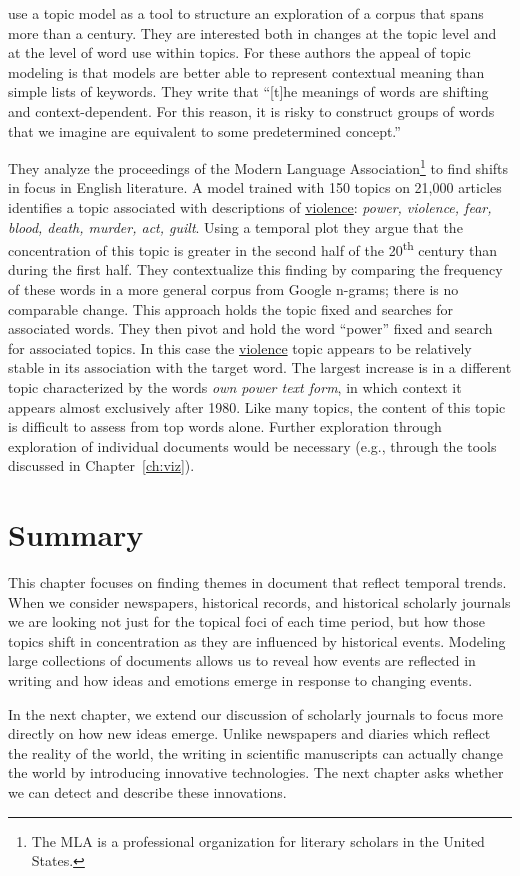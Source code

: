 \citet{Goldstone-14} use a topic model as a tool to structure an exploration of a corpus that spans more than a century.
They are interested both in changes at the topic level and at the level of word use within topics.
For these authors the appeal of topic modeling is that models are better able to represent contextual meaning than simple lists of keywords. They write that ``[t]he meanings
of words are shifting and context-dependent. For this reason, it is risky to
construct groups of words that we imagine are equivalent to some predetermined
concept.''

They analyze the proceedings of the Modern Language Association\footnote{The MLA is a professional organization for literary scholars in the United States.} to find shifts in focus in English literature.
A model trained with 150 topics on 21,000 articles identifies a topic associated with descriptions of \underline{violence}: {\em power,
violence, fear, blood, death, murder, act, guilt}. Using a temporal plot they argue that the concentration of this topic is greater in the second half of the 20\textsuperscript{th} century than during the first half.
They contextualize this finding by comparing the frequency of these words in a more general corpus from Google n-grams; there is no comparable change.
This approach holds the topic fixed and searches for associated words.
They then pivot and hold the word ``power'' fixed and search for associated topics.
In this case the \underline{violence} topic appears to be relatively stable in its association with the target word. The largest increase is in a different topic characterized by the words {\em own power text form}, in which context it appears almost exclusively after 1980.
Like many topics, the content of this topic is difficult to assess from top words alone.
Further exploration through exploration of individual documents would be necessary (e.g., through the tools discussed in Chapter~\ref{ch:viz}).

\section{Summary}

This chapter focuses on finding themes in document that reflect temporal trends.
When we consider newspapers, historical records, and historical scholarly journals we are looking not just for the topical foci of each time period, but how those topics shift in concentration as they are influenced by historical events.
Modeling large collections of documents allows us to reveal how events are reflected in writing and how ideas and emotions emerge in response to changing events.

In the next chapter, we extend our discussion of scholarly journals to focus more directly on how new ideas emerge.
Unlike newspapers and diaries which reflect the reality of the world, the writing in scientific manuscripts can actually change the world by introducing innovative technologies.
The next chapter asks whether we can detect and describe these innovations.
